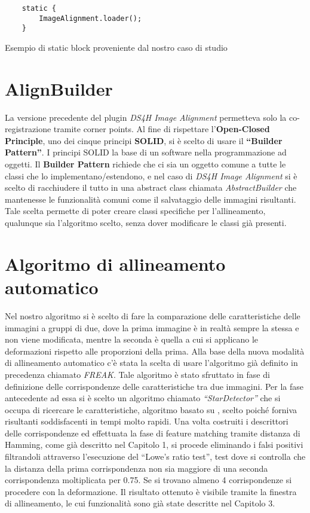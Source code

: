 \begin{listing}[H]
\begin{verbatim}
    static {
        ImageAlignment.loader();
    }
\end{verbatim}
\caption{Esempio di static block proveniente dal nostro caso di studio}\label{lst:static-call}
\end{listing}

\section{AlignBuilder}
\noindent La versione precedente del plugin \textit{DS4H Image Alignment} permetteva solo la co-registrazione tramite corner points. Al fine di rispettare l'\textbf{Open-Closed Principle}, uno dei cinque principi \textbf{SOLID}, si è scelto di usare il \textbf{``Builder Pattern''}. I principi SOLID la base di un software nella programmazione ad oggetti. Il \textbf{Builder Pattern} richiede che ci sia un oggetto comune a tutte le classi che lo implementano/estendono, e nel caso di \textit{DS4H Image Alignment} si è scelto di racchiudere il tutto in una abstract class chiamata \textit{AbstractBuilder} che mantenesse le funzionalità comuni come il salvataggio delle immagini risultanti. Tale scelta permette di poter creare classi specifiche per l'allineamento, qualunque sia l'algoritmo scelto, senza dover modificare le classi già presenti.

\section{Algoritmo di allineamento automatico}
\noindent Nel nostro algoritmo si è scelto di fare la comparazione delle caratteristiche delle immagini a gruppi di due, dove la prima immagine è in realtà sempre la stessa e non viene modificata, mentre la seconda è quella a cui si applicano le deformazioni rispetto alle proporzioni della prima. Alla base della nuova modalità di allineamento automatico c'è stata la scelta di usare l'algoritmo già definito in precedenza chiamato \textit{FREAK}. Tale algoritmo è stato sfruttato in fase di definizione delle corrispondenze delle caratteristiche tra due immagini. Per la fase antecedente ad essa si è scelto un algoritmo chiamato \textit{``StarDetector''} che si occupa di ricercare le caratteristiche, algoritmo basato su \cite{10.1007/978-3-540-88693-8_8}, scelto poiché forniva risultanti soddisfacenti in tempi molto rapidi. Una volta costruiti i descrittori delle corrispondenze ed effettuata la fase di feature matching tramite distanza di Hamming, come già descritto nel Capitolo 1, si procede eliminando i falsi positivi filtrandoli attraverso l'esecuzione del ``Lowe's ratio test'', test dove si controlla che la distanza della prima corrispondenza non sia maggiore di una seconda corrispondenza moltiplicata per 0.75. Se si trovano almeno 4 corrispondenze si procedere con la deformazione. Il risultato ottenuto è visibile tramite la finestra di allineamento, le cui funzionalità sono già state descritte nel Capitolo 3. 

